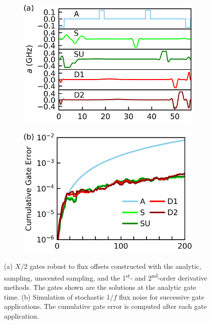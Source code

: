 \begin{figure}[ht]
  \begin{subfigure}{.4\textwidth}
    \includegraphics[width=\linewidth]{assets/f3a.png}
    \caption{}
    \label{fig:stochastica}
  \end{subfigure}\hspace{0.025\textwidth}
  \begin{subfigure}{.4\textwidth}
    \includegraphics[width=\linewidth]{assets/f3b.png}
        \caption{}
    \label{fig:stochasticb}
  \end{subfigure}
  \caption{
    (a) $X/2$ gates robust to flux offsets constructed with the analytic,
    sampling, unscented sampling, and the 1\textsuperscript{st}-
    and 2\textsuperscript{nd}-order derivative methods. The gates shown
    are the solutions at the analytic gate time.
    (b) Simulation of stochastic 1/$f$ flux noise for
    successive gate applications. The cumulative
    gate error is computed after each gate application.
  }
  \label{fig:stochastic}
\end{figure}
